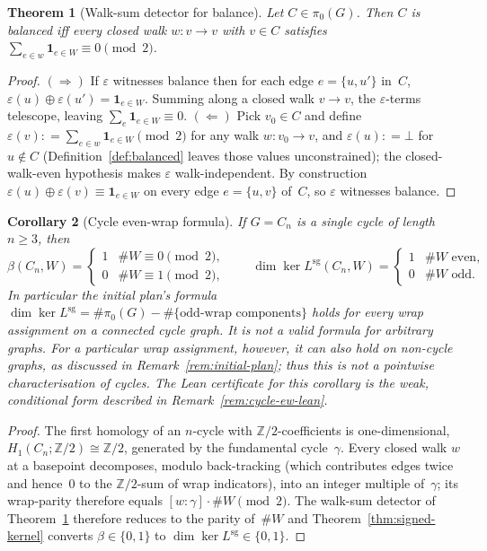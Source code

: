 \documentclass[11pt,a4paper]{amsart}
\theoremstyle{plain}
\newtheorem{theorem}{Theorem}[section]
\newtheorem{corollary}[theorem]{Corollary}
\theoremstyle{definition}
\theoremstyle{remark}
\DeclareMathOperator{\Ker}{ker}
\newcommand{\ZZ}{\mathbb{Z}}
\newcommand{\Lsigned}{L^{\operatorname{sg}}}
\newcommand{\comp}{\pi_0}
\newcommand{\defeq}{\mathrel{\mathop:}=}
\begin{document}
\begin{theorem}[Walk-sum detector for balance]\label{thm:walk-sum}
Let $C\in\comp(G)$. Then $C$ is balanced iff every closed walk
$w:v\to v$ with $v\in C$ satisfies
$\sum_{e\in w} \mathbf{1}_{e\in W} \equiv 0 \pmod 2$.
\end{theorem}

\begin{proof}
$(\Rightarrow)$ If $\varepsilon$ witnesses balance then for each
edge $e=\{u,u'\}$ in~$C$, $\varepsilon(u)\oplus \varepsilon(u') =
\mathbf{1}_{e\in W}$. Summing along a closed walk $v\to v$, the
$\varepsilon$-terms telescope, leaving
$\sum_e \mathbf{1}_{e\in W}\equiv 0$.
$(\Leftarrow)$ Pick $v_0\in C$ and define
$\varepsilon(v)\defeq \sum_{e\in w} \mathbf{1}_{e\in W}\pmod 2$
for any walk $w:v_0\to v$, and $\varepsilon(u)\defeq\bot$ for
$u\notin C$ (Definition~\ref{def:balanced} leaves those values
unconstrained); the closed-walk-even hypothesis makes
$\varepsilon$ walk-independent. By construction
$\varepsilon(u)\oplus \varepsilon(v)\equiv \mathbf{1}_{e\in W}$ on
every edge $e=\{u,v\}$ of~$C$, so $\varepsilon$ witnesses balance.
\end{proof}

\begin{corollary}[Cycle even-wrap formula]\label{cor:cycle-ew}
If $G=C_n$ is a single cycle of length~$n\ge 3$, then
\[
  \beta(C_n,W) = \begin{cases} 1 & \#W \equiv 0\pmod 2,\\
    0 & \#W \equiv 1\pmod 2,\end{cases}
  \qquad
  \dim\Ker \Lsigned(C_n,W) = \begin{cases} 1 & \#W \text{ even,}\\
    0 & \#W \text{ odd.}\end{cases}
\]
In particular the initial plan's formula
$\dim\Ker\Lsigned = \#\comp(G) - \#\{\text{odd-wrap components}\}$
holds for \emph{every wrap assignment} on a connected cycle graph.
It is not a valid formula for arbitrary graphs. For a \emph{particular}
wrap assignment, however, it can also hold on non-cycle graphs,
as discussed in Remark~\ref{rem:initial-plan}; thus this is not a
pointwise characterisation of cycles. The Lean certificate for this
corollary is the weak, conditional form described in
Remark~\ref{rem:cycle-ew-lean}.
\end{corollary}

\begin{proof}
The first homology of an $n$-cycle with $\ZZ/2$-coefficients is
one-dimensional, $H_1(C_n;\ZZ/2)\cong\ZZ/2$, generated by the
fundamental cycle~$\gamma$. Every closed walk $w$ at a basepoint
decomposes, modulo back-tracking (which contributes
edges twice and hence~$0$ to the $\ZZ/2$-sum of wrap indicators),
into an integer multiple of~$\gamma$; its wrap-parity therefore
equals $[w:\gamma]\cdot\#W \pmod 2$. The walk-sum detector of
Theorem~\ref{thm:walk-sum} therefore reduces to the parity
of~$\#W$ and Theorem~\ref{thm:signed-kernel} converts
$\beta\in\{0,1\}$ to $\dim\Ker\Lsigned\in\{0,1\}$.
\end{proof}
\end{document}
